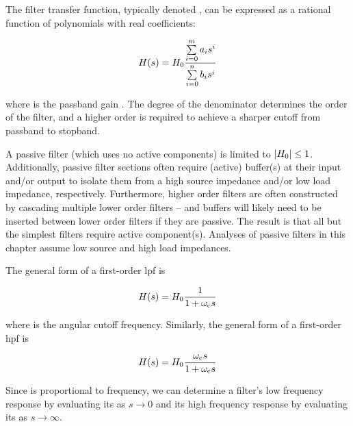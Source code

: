 The filter transfer function, typically denoted \Hs, can be expressed as a rational function of polynomials with real coefficients:

\textcolor{red}{
\begin{equation}
	H(s) = H_0\frac{\sum\limits_{i=0}^{m} a_i s^i}{\sum\limits_{i=0}^n b_i s^i}
	\label{eq:general_filter_TF}
\end{equation}
}

where \Hpass is the passband gain \autocite[8.5]{basic-linear-design-adi}.
The degree of the denominator determines the order of the filter, and a higher order is required to achieve a sharper cutoff from passband to stopband.

A passive filter (which uses no active components) is limited to \(\left|H_0\right| \leq 1\).
Additionally, passive filter sections often require (active) buffer(s) at their input and/or output to isolate them from a high source impedance and/or low load impedance, respectively.
Furthermore, higher order filters are often constructed by cascading multiple lower order filters -- and buffers will likely need to be inserted between lower order filters if they are passive.
The result is that all but the simplest filters require active component(s).
Analyses of passive filters in this chapter assume low source and high load impedances.

The general form of a first-order \ac{lpf} is

\textcolor{red}{
\begin{equation}
	H(s) = H_0\frac{1}{1 + \omega_\mathrm{c} s}
	\label{eq:1storderLPF}
\end{equation}
}

where \wcutoff is the angular cutoff frequency.
Similarly, the general form of a first-order \ac{hpf} is

\textcolor{red}{
\begin{equation}
	H(s) = H_0\frac{\omega_\mathrm{c} s}{1 + \omega_\mathrm{c} s}
	\label{eq:1storderHPF}
\end{equation}
}


Since \s is proportional to frequency, we can determine a filter's low frequency response by evaluating its \Hs as \(s \to 0\) and its high frequency response by evaluating its \Hs as \(s \to \infty\).

